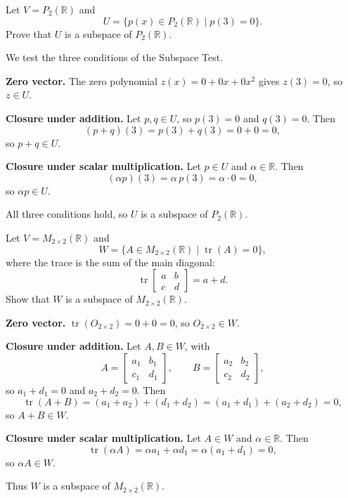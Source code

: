 \begin{example}
Let $V = P_2(\mathbb{R})$ and
\[
U = \{p(x) \in P_2(\mathbb{R}) \mid p(3) = 0\}.
\]
Prove that $U$ is a subspace of $P_2(\mathbb{R})$.

\begin{solution}
We test the three conditions of the Subspace Test.

\medskip
\textbf{Zero vector.} The zero polynomial $z(x) = 0 + 0x + 0x^2$ gives $z(3) = 0$, so $z \in U$.

\medskip
\textbf{Closure under addition.} Let $p, q \in U$, so $p(3) = 0$ and $q(3) = 0$. Then
\[
(p + q)(3) = p(3) + q(3) = 0 + 0 = 0,
\]
so $p + q \in U$.

\medskip
\textbf{Closure under scalar multiplication.} Let $p \in U$ and $\alpha \in \mathbb{R}$. Then
\[
(\alpha p)(3) = \alpha\, p(3) = \alpha \cdot 0 = 0,
\]
so $\alpha p \in U$.

All three conditions hold, so $U$ is a subspace of $P_2(\mathbb{R})$.
\end{solution}
\end{example}

\begin{example}
Let $V = M_{2\times 2}(\mathbb{R})$ and
\[
W = \{ A \in M_{2\times 2}(\mathbb{R}) \mid \operatorname{tr}(A) = 0 \},
\]
where the trace is the sum of the main diagonal:
\[
\operatorname{tr}\begin{bmatrix} a & b \\ c & d \end{bmatrix} = a + d.
\]
Show that $W$ is a subspace of $M_{2\times 2}(\mathbb{R})$.

\begin{solution}
\textbf{Zero vector.} $\operatorname{tr}(O_{2\times 2}) = 0 + 0 = 0$, so $O_{2\times 2} \in W$.

\medskip
\textbf{Closure under addition.} Let $A, B \in W$, with
\[
A = \begin{bmatrix} a_1 & b_1 \\ c_1 & d_1 \end{bmatrix}, \qquad
B = \begin{bmatrix} a_2 & b_2 \\ c_2 & d_2 \end{bmatrix},
\]
so $a_1 + d_1 = 0$ and $a_2 + d_2 = 0$. Then
\[
\operatorname{tr}(A + B) = (a_1 + a_2) + (d_1 + d_2) = (a_1 + d_1) + (a_2 + d_2) = 0,
\]
so $A + B \in W$.

\medskip
\textbf{Closure under scalar multiplication.} Let $A \in W$ and $\alpha \in \mathbb{R}$. Then
\[
\operatorname{tr}(\alpha A) = \alpha a_1 + \alpha d_1 = \alpha(a_1 + d_1) = 0,
\]
so $\alpha A \in W$.

Thus $W$ is a subspace of $M_{2\times 2}(\mathbb{R})$.
\end{solution}
\end{example}

